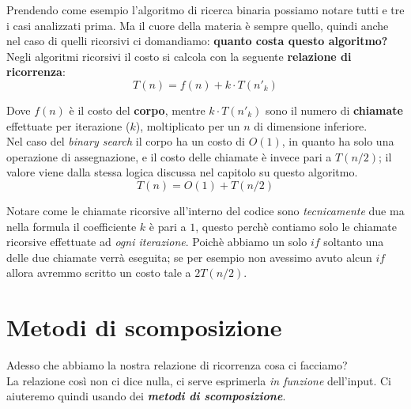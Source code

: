 \documentclass{article}
\begin{document}
\vspace{0.3cm}

\noindent Prendendo come esempio l'algoritmo di ricerca binaria possiamo notare
tutti e tre i casi analizzati prima. Ma il cuore della materia è sempre quello,
quindi anche nel caso di quelli ricorsivi ci domandiamo: 
\textbf{quanto costa questo algoritmo?} \\
Negli algoritmi ricorsivi il costo si calcola con la seguente 
\textbf{relazione di ricorrenza}:
\[ T(n) = f(n) + k \cdot T(n'_k) \]

\noindent Dove $f(n)$ è il costo del \textbf{corpo}, mentre 
$k \cdot T(n'_k)$ sono il numero di \textbf{chiamate} effettuate per 
iterazione ($k$), moltiplicato per un $n$ di dimensione inferiore. \\
Nel caso del \textit{binary search} il corpo ha un costo di $O(1)$, in 
quanto ha solo una operazione di assegnazione, e il costo delle chiamate
è invece pari a $T(n/2)$; il valore viene dalla stessa logica discussa nel 
capitolo su questo algoritmo. \\

\[ T(n) = O(1) + T(n/2) \]

Notare come le chiamate ricorsive all'interno del codice sono 
\textit{tecnicamente} due ma nella formula il coefficiente $k$ è 
pari a $1$, questo perchè contiamo solo le chiamate ricorsive effettuate ad 
\textit{ogni iterazione}. Poichè abbiamo un solo $if$ soltanto una 
delle due chiamate verrà eseguita; se per esempio non avessimo avuto alcun
$if$ allora avremmo scritto un costo tale a $2T(n/2)$.

\section*{Metodi di scomposizione}
Adesso che abbiamo la nostra relazione di ricorrenza cosa ci facciamo? \\
La relazione così non ci dice nulla, ci serve esprimerla \textit{in funzione}
dell'input. Ci aiuteremo quindi usando dei 
\textbf{\textit{metodi di scomposizione}}.
\end{document}
